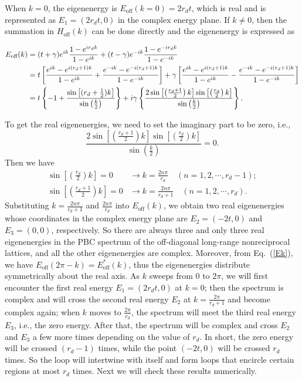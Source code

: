 \documentclass[prb,aps,twocolumn,showpacs]{revtex4-2} %
\begin{document}
When $k=0$, the eigenenergy is $E_\text{off} (k=0)=2r_d t$, which is real and is represented as $E_1 = (2r_d t,0)$ in the complex energy plane. If $k \neq 0$, then the summation in $H_\text{off}(k)$ can be done directly and the eigenenergy is expressed as
\begin{widetext}
\begin{align}
E_\text{off}(k) &= (t+\gamma)e^{ik}\frac{1-e^{ir_d k}}{1-e^{ik}} + (t-\gamma)e^{-ik} \frac{1-e^{-ir_d k}}{1-e^{-ik}} \notag \\
&= t \left[ \frac{e^{ik}-e^{i(r_d+1) k}}{1-e^{ik}} + \frac{e^{-ik}-e^{-i(r_d+1) k}}{1-e^{-ik}} \right] + \gamma \left[ \frac{e^{ik}-e^{i(r_d+1) k}}{1-e^{ik}} - \frac{e^{-ik}-e^{-i(r_d+1) k}}{1-e^{-ik}} \right] \notag \\
&= t \left\lbrace -1 + \frac{\sin \left[ (r_d + \frac{1}{2}) k \right]}{\sin \left( \frac{k}{2} \right) } \right\rbrace
+ i \gamma \left\lbrace \frac{2 \sin \left[ \left( \frac{r_d+1}{2} \right) k \right] \sin \left[ \left( \frac{r_d}{2} \right) k \right] } {\sin \left( \frac{k}{2} \right) } \right\rbrace. \label{Ek} 
\end{align}
\end{widetext}
To get the real eigenenergies, we need to set the imaginary part to be zero, i.e.,
\begin{equation}
\frac{2 \sin \left[ \left( \frac{r_d+1}{2} \right) k \right] \sin \left[ \left( \frac{r_d}{2} \right) k \right] } {\sin \left( \frac{k}{2} \right)} = 0.
\end{equation}
Then we have 
\begin{align}
\sin \left[ \left( \frac{r_d}{2} \right) k \right] = 0 & \rightarrow k = \frac{2n\pi}{r_d} \quad (n=1,2,\cdots,r_d-1); \\
\sin \left[ \left( \frac{r_d+1}{2} \right) k \right] = 0 & \rightarrow k = \frac{2n\pi}{r_d+1} \quad (n=1,2,\cdots,r_d).
\end{align}
Substituting $k = \frac{2n\pi}{r_d+1}$ and $\frac{2n\pi}{r_d}$ into $E_\text{off}(k)$, we obtain two real eigenenergies whose coordinates in the complex energy plane are $E_2=(-2t,0)$ and $E_3=(0,0)$, respectively. So there are always three and only three real eigenenergies in the PBC spectrum of the off-diagonal long-range nonreciprocal lattices, and all the other eigenenergies are complex. Moreover, from Eq.~(\ref{Ek}), we have $E_\text{off}(2\pi-k)=E_\text{off}^*(k)$, thus the eigenenergies distribute symmetrically about the real axis. As $k$ sweeps from $0$ to $2\pi$, we will first encounter the first real energy $E_1 = (2r_d t,0)$ at $k=0$; then the spectrum is complex and will cross the second real energy $E_2$ at $k=\frac{2\pi}{r_d+1}$ and become complex again; when $k$ moves to $\frac{2\pi}{r_d}$, the spectrum will meet the third real energy $E_3$, i.e., the zero energy. After that, the spectrum will be complex and cross $E_2$ and $E_3$ a few more times depending on the value of $r_d$. In short, the zero energy will be crossed $(r_d-1)$ times, while the point $(-2t,0)$ will be crossed $r_d$ times. So the loop will intertwine with itself and form loops that encircle certain regions at most $r_d$ times. Next we will check these results numerically.
\end{document}

